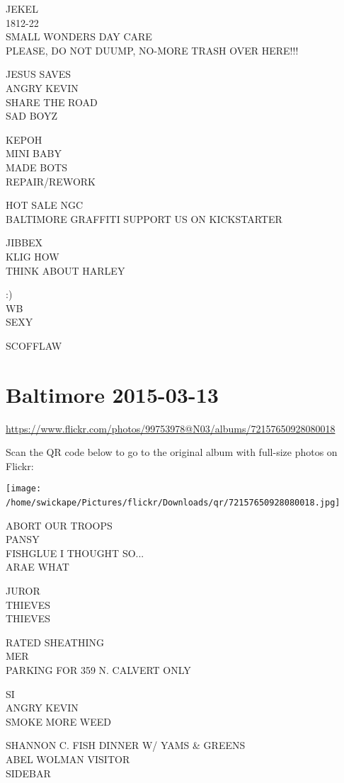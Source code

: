 \documentclass[10pt,letterpaper]{article}
\begin{document}
JEKEL\\
1812{-}22\\
SMALL WONDERS DAY CARE\\
PLEASE, DO NOT DUUMP, NO{-}MORE TRASH OVER HERE!!!

JESUS SAVES\\
ANGRY KEVIN\\
SHARE THE ROAD\\
SAD BOYZ

KEPOH\\
MINI BABY\\
MADE BOTS\\
REPAIR/REWORK

HOT SALE NGC\\
BALTIMORE GRAFFITI SUPPORT US ON KICKSTARTER

JIBBEX\\
KLIG HOW\\
THINK ABOUT HARLEY

:)\\
WB\\
SEXY

SCOFFLAW
\

\section*{Baltimore 2015-03-13}

\url{https://www.flickr.com/photos/99753978@N03/albums/72157650928080018}

Scan the QR code below to go to the original album with full-size photos on Flickr:

\texttt{[image: /home/swickape/Pictures/flickr/Downloads/qr/72157650928080018.jpg]}
\

ABORT OUR TROOPS\\
PANSY\\
FISHGLUE I THOUGHT SO...\\
ARAE WHAT

JUROR\\
THIEVES\\
THIEVES

RATED SHEATHING\\
MER\\
PARKING FOR 359 N. CALVERT ONLY

SI\\
ANGRY KEVIN\\
SMOKE MORE WEED

SHANNON C. FISH DINNER W/ YAMS \& GREENS\\
ABEL WOLMAN VISITOR\\
SIDEBAR
\end{document}

